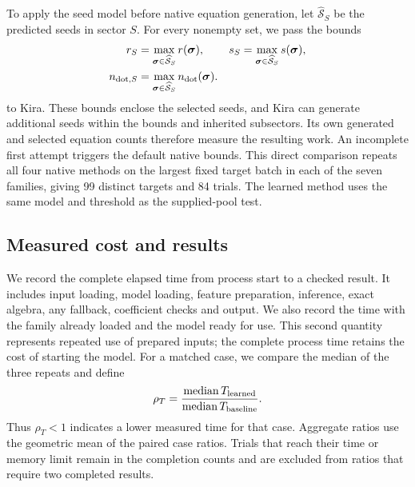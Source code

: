 To apply the seed model before native equation generation, let
$\widehat{\mathcal S}_S$ be the predicted seeds in sector $S$.
For every nonempty set, we pass the bounds
\begin{equation}
 \begin{aligned}
 r_S&=\max_{\boldsymbol\sigma\in\widehat{\mathcal S}_S}r(\boldsymbol\sigma),
 &s_S&=\max_{\boldsymbol\sigma\in\widehat{\mathcal S}_S}s(\boldsymbol\sigma),\\
 n_{{\rm dot},S}
 &=\max_{\boldsymbol\sigma\in\widehat{\mathcal S}_S}
           n_{\rm dot}(\boldsymbol\sigma).
 \end{aligned}
 \label{eq:native-learned-bounds}
\end{equation}
to Kira. These bounds enclose the selected seeds, and Kira can generate
additional seeds within the bounds and inherited subsectors.
Its own generated and selected equation counts therefore measure
the resulting work. An incomplete first attempt triggers the default
native bounds. This direct comparison repeats all four native
methods on the largest fixed target batch in each of the seven
families, giving 99 distinct targets and 84 trials. The learned
method uses the same model and threshold as the supplied-pool test.

\subsection{Measured cost and results}
We record the complete elapsed time from process start to a checked
result. It includes input loading, model loading, feature preparation,
inference, exact algebra, any fallback, coefficient checks and output.
We also record the time with the family already loaded and the model
ready for use. This second quantity represents repeated use of prepared
inputs; the complete process time retains the cost of starting the model.
For a matched case, we compare the median of the three repeats and
define
\begin{equation}
 \rho_T=\frac{\operatorname{median}T_{\rm learned}}
              {\operatorname{median}T_{\rm baseline}}.
 \label{eq:cost-ratio}
\end{equation}
Thus $\rho_T<1$ indicates a lower measured time for that case.
Aggregate ratios use the geometric mean of the paired case ratios.
Trials that reach their time or memory limit remain in the completion
counts and are excluded from ratios that require two completed results.

